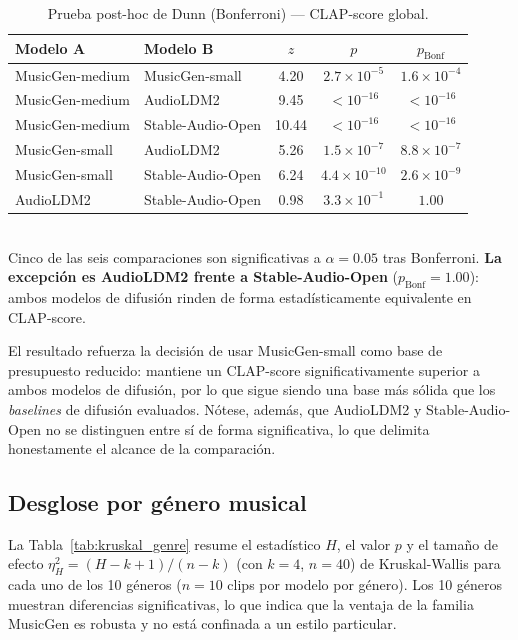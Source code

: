 \begin{table}[t]
  \caption{Prueba post-hoc de Dunn (Bonferroni) — CLAP-score global.}
  \label{tab:dunn}
  \centering
  \begin{tabular}{llccc}
    \hline
    \textbf{Modelo A} & \textbf{Modelo B} & \textbf{$z$} & \textbf{$p$} & \textbf{$p_{\text{Bonf}}$} \\
    \hline
    MusicGen-medium  & MusicGen-small    & 4.20  & $2.7\times10^{-5}$  & $1.6\times10^{-4}$ \\
    MusicGen-medium  & AudioLDM2         & 9.45  & $<10^{-16}$         & $<10^{-16}$        \\
    MusicGen-medium  & Stable-Audio-Open & 10.44 & $<10^{-16}$         & $<10^{-16}$        \\
    MusicGen-small   & AudioLDM2         & 5.26  & $1.5\times10^{-7}$  & $8.8\times10^{-7}$ \\
    MusicGen-small   & Stable-Audio-Open & 6.24  & $4.4\times10^{-10}$ & $2.6\times10^{-9}$ \\
    AudioLDM2        & Stable-Audio-Open & 0.98  & $3.3\times10^{-1}$  & $1.00$ \\
    \hline
  \end{tabular}
  \smallskip\\
  \footnotesize{Cinco de las seis comparaciones son significativas a $\alpha=0.05$
  tras Bonferroni. \textbf{La excepción es AudioLDM2 frente a Stable-Audio-Open}
  ($p_{\text{Bonf}}=1.00$): ambos modelos de difusión rinden de forma
  estadísticamente equivalente en CLAP-score.}
\end{table}

El resultado refuerza la decisión de usar MusicGen-small como base de presupuesto
reducido: mantiene un CLAP-score significativamente superior a ambos modelos de
difusión, por lo que sigue siendo una base más sólida que los \textit{baselines}
de difusión evaluados. Nótese, además, que AudioLDM2 y Stable-Audio-Open no se
distinguen entre sí de forma significativa, lo que delimita honestamente el
alcance de la comparación.

\subsection{Desglose por género musical}
\label{sec:benchmark:genre}

La Tabla~\ref{tab:kruskal_genre} resume el estadístico $H$, el valor $p$ y el
tamaño de efecto $\eta_H^2 = (H-k+1)/(n-k)$ (con $k=4$, $n=40$) de Kruskal-Wallis
para cada uno de los 10 géneros ($n=10$ clips por modelo por género). Los 10
géneros muestran diferencias significativas, lo que indica que la ventaja de la
familia MusicGen es robusta y no está confinada a un estilo particular.


